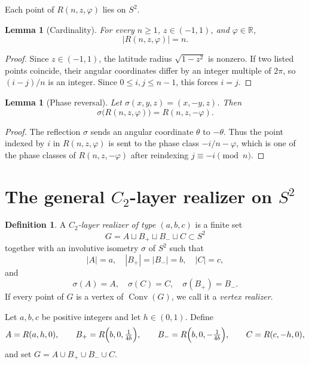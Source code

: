 \documentclass[11pt]{article}
\newtheorem{lemma}[theorem]{Lemma}
\theoremstyle{definition}
\newtheorem{definition}[theorem]{Definition}
\theoremstyle{remark}
\newcommand{\Conv}{\operatorname{Conv}}
\newcommand{\Ctwo}{C_2}
\begin{document}
Each point of $R(n,z,\varphi)$ lies on $S^2$.

\begin{lemma}[Cardinality]\label{lem:card}
For every $n\ge1$, $z\in(-1,1)$, and $\varphi\in\mathbb R$,
\[
|R(n,z,\varphi)|=n .
\]
\end{lemma}

\begin{proof}
Since $z\in(-1,1)$, the latitude radius $\sqrt{1-z^2}$ is nonzero. If two
listed points coincide, their angular coordinates differ by an integer
multiple of $2\pi$, so $(i-j)/n$ is an integer. Since $0\le i,j\le n-1$,
this forces $i=j$.
\end{proof}

\begin{lemma}[Phase reversal]\label{lem:phase}
Let $\sigma(x,y,z)=(x,-y,z)$. Then
\[
\sigma\bigl(R(n,z,\varphi)\bigr)=R(n,z,-\varphi).
\]
\end{lemma}

\begin{proof}
The reflection $\sigma$ sends an angular coordinate $\theta$ to $-\theta$.
Thus the point indexed by $i$ in $R(n,z,\varphi)$ is sent to the phase
class $-i/n-\varphi$, which is one of the phase classes of
$R(n,z,-\varphi)$ after reindexing $j\equiv -i \pmod n$.
\end{proof}

\section{The general $\Ctwo$-layer realizer on $S^2$}\label{sec:general}

\begin{definition}\label{def:realizer}
A \emph{$\Ctwo$-layer realizer of type $(a,b,c)$} is a finite set
\[
G=A\sqcup B_+\sqcup B_-\sqcup C\subset S^2
\]
together with an involutive isometry $\sigma$ of $S^2$ such that
\[
|A|=a,\quad |B_+|=|B_-|=b,\quad |C|=c,
\]
and
\[
\sigma(A)=A,\quad \sigma(C)=C,\quad \sigma(B_+)=B_- .
\]
If every point of $G$ is a vertex of $\Conv(G)$, we call it a
\emph{vertex realizer}.
\end{definition}

Let $a,b,c$ be positive integers and let $h\in(0,1)$. Define
\[
A=R(a,h,0),\qquad
B_+=R\Bigl(b,0,\tfrac{1}{4b}\Bigr),\qquad
B_-=R\Bigl(b,0,-\tfrac{1}{4b}\Bigr),\qquad
C=R(c,-h,0),
\]
and set $G=A\cup B_+\cup B_-\cup C$.
\end{document}
